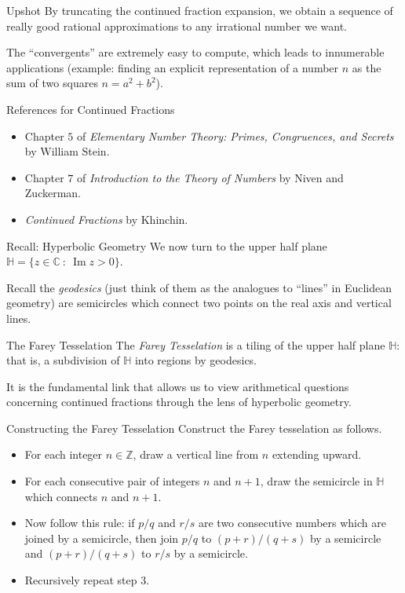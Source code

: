 \documentclass[serif]{beamer}
\newcommand{\ZZ}{\mathbb{Z}}
\newcommand{\HH}{\mathbb{H}}
\newcommand{\CC}{\mathbb{C}}
\begin{document}
\begin{frame}{Upshot}
    By truncating the continued fraction expansion, we obtain a sequence of really good rational approximations to any irrational number we want. 
    
    The ``convergents'' are extremely easy to compute, which leads to innumerable applications (example: finding an explicit representation of a number $n$ as the sum of two squares $n=a^2+b^2$).
\end{frame}

\begin{frame}{References for Continued Fractions}
    \begin{itemize}
        \item Chapter $5$ of \emph{Elementary Number Theory: Primes, Congruences, and Secrets} by William Stein.
        \item Chapter $7$ of \emph{Introduction to the Theory of Numbers} by Niven and Zuckerman. 
        \item \emph{Continued Fractions} by Khinchin.
    \end{itemize}
\end{frame}

\begin{frame}{Recall: Hyperbolic Geometry}
    We now turn to the upper half plane $\HH=\{z\in \CC\ :\ \operatorname{Im}{z}>0\}$.
    
    Recall the \emph{geodesics} (just think of them as the analogues to ``lines'' in Euclidean geometry) are semicircles which connect two points on the real axis and vertical lines. 
\end{frame}

\begin{frame}{The Farey Tesselation}
    The \emph{Farey Tesselation} is a tiling of the upper half plane $\HH$: that is, a subdivision of $\HH$ into regions by geodesics.
    
    It is the fundamental link that allows us to view arithmetical questions concerning continued fractions through the lens of hyperbolic geometry.
\end{frame}

\begin{frame}{Constructing the Farey Tesselation}
    Construct the Farey tesselation as follows.
    \begin{itemize}
        \item For each integer $n\in \ZZ$, draw a vertical line from $n$ extending upward. 
        \item For each consecutive pair of integers $n$ and $n+1$, draw the semicircle in $\HH$ which connects $n$ and $n+1$.
        \item Now follow this rule: if $p/q$ and $r/s$ are two consecutive numbers which are joined by a semicircle, then join $p/q$ to $(p+r)/(q+s)$ by a semicircle and $(p+r)/(q+s)$ to $r/s$ by a semicircle.
        \item Recursively repeat step 3.
    \end{itemize}
\end{frame}
\end{document}
